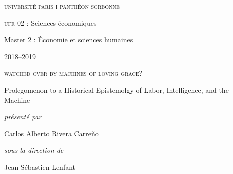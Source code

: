 \documentclass[version=last,draft=false,paper=A4,portrait,twoside=true,twocolumn=false,headinclude=false,footinclude=false,fontsize=12,BCOR=20mm,DIV=calc,pagesize=auto,titlepage=firstiscover,mpinclude=false,open=right,chapterprefix=true,numbers=autoendperiod,headsepline=false,headings=twolinechapter,parskip=false]{scrbook}
\author{Carlos Alberto Rivera Carreño}
\date{}
\title{}
\begin{document}


\begin{titlepage}
 \centering
\begin{french}
 {\large \textsc{université paris i panthéon sorbonne} \par}
  \vspace*{0.01\textheight}
 {\large \textsc{ufr} 02 : Sciences économiques  \par}
  \vspace*{0.01\textheight}
 {\large Master 2 : Économie et sciences humaines \par}
  \vspace*{0.01\textheight}
 {\large 2018--2019 \par}
\end{french}
  \vspace*{0.3\textheight}
 {\huge \textsc{watched over by machines of loving grace?}  \par}
  \vspace*{0.02\textheight}
 {\Large Prolegomenon to a Historical Epistemolgy of  Labor, Intelligence, and the Machine \par}
\vfill
\begin{french}
 {\large\itshape présenté par  \par}
\end{french}
 {\Large Carlos Alberto Rivera Carreño \par}
  \vspace*{0.05\textheight}
\begin{french}
 {\large\itshape sous la direction de \par}
\end{french}
 {\Large Jean-Sébastien Lenfant \par}
\end{titlepage}

\pagestyle{empty}
\end{document}
